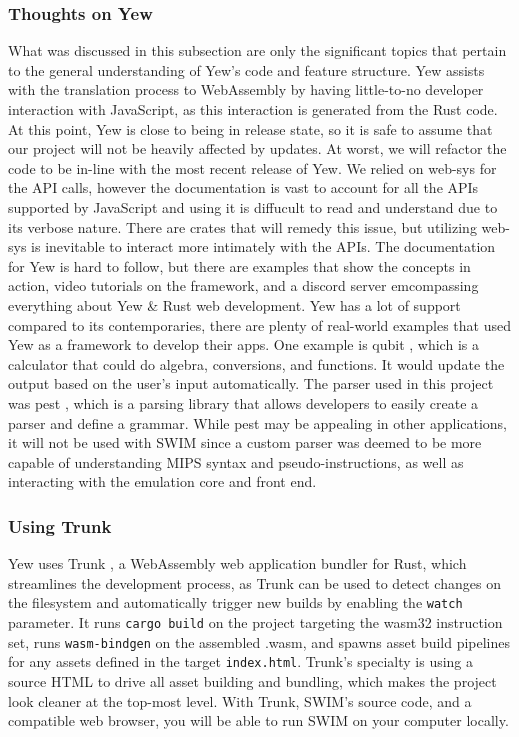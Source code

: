 \documentclass[
    paper=letter,
    parskip=half,
    fontsize=12pt,
    titlepage=firstiscover,
    toc=bibliography,
    numbers=endperiod
]{scrartcl}
\begin{document}
\subsubsection{Thoughts on Yew}

What was discussed in this subsection are only the significant topics
that pertain to the general understanding of Yew's code and feature
structure. Yew assists with the translation process to WebAssembly by
having little-to-no developer interaction with JavaScript, as this
interaction is generated from the Rust code. At this point, Yew is close
to being in release state, so it is safe to assume that our project will
not be heavily affected by updates. At worst, we will refactor the code
to be in-line with the most recent release of Yew. We relied on web-sys
for the API calls, however the documentation is vast to account for all
the APIs supported by JavaScript and using it is diffucult to read and
understand due to its verbose nature. There are crates that will remedy
this issue, but utilizing web-sys is inevitable to interact more
intimately with the APIs. The documentation for Yew is hard to follow,
but there are examples that show the concepts in action, video tutorials
on the framework, and a discord server emcompassing everything about Yew
\& Rust web development. Yew has a lot of support compared to its
contemporaries, there are plenty of real-world examples that used Yew as
a framework to develop their apps. One example is qubit \cite{qubit},
which is a calculator that could do algebra, conversions, and functions.
It would update the output based on the user's input automatically. The
parser used in this project was pest \cite{pest}, which is a parsing
library that allows developers to easily create a parser and define a
grammar. While pest may be appealing in other applications, it will not
be used with SWIM since a custom parser was deemed to be more capable of
understanding MIPS syntax and pseudo-instructions, as well as
interacting with the emulation core and front end.

\subsubsection{Using Trunk}

Yew uses Trunk \cite{trunk}, a WebAssembly web application bundler for
Rust, which streamlines the development process, as Trunk can be used to
detect changes on the filesystem and automatically trigger new builds by
enabling the \texttt{watch} parameter. It runs \texttt{cargo build} on
the project targeting the wasm32 instruction set, runs
\texttt{wasm-bindgen} on the assembled .wasm, and spawns asset build
pipelines for any assets defined in the target \texttt{index.html}.
Trunk's specialty is using a source HTML to drive all asset building and
bundling, which makes the project look cleaner at the top-most level.
With Trunk, SWIM's source code, and a compatible web browser, you will
be able to run SWIM on your computer locally.
\end{document}
